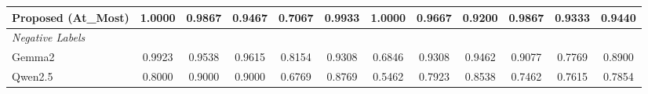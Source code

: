 \begin{table}
{\begin{tabular}{lcccccccccc||c}
            Proposed (At\_Most)                & 1.0000                                                  & 0.9867                                                  & 0.9467                                                  & 0.7067                                                            & 0.9933                                                  & 1.0000                                                    & 0.9667                                                            & 0.9200                                                  & 0.9867                                 & 0.9333                                   & 0.9440 \\
            \hline
            \textit{Negative Labels}           &                                                         &                                                         &                                                         &                                                                   &                                                          &                                                           &                                                                  &                                                         &                                        &                                          &       \\
            Gemma2                             & 0.9923                                                  & 0.9538                                                  & 0.9615                                                  & 0.8154                                                            & 0.9308                                                  & 0.6846                                                    & 0.9308                                                            & 0.9462                                                  & 0.9077                                 & 0.7769                                   & 0.8900 \\
            Qwen2.5                            & 0.8000                                                  & 0.9000                                                  & 0.9000                                                  & 0.6769                                                            & 0.8769                                                  & 0.5462                                                    & 0.7923                                                            & 0.8538                                                  & 0.7462                                 & 0.7615                                   & 0.7854 \\

\end{tabular}}
\end{table}

